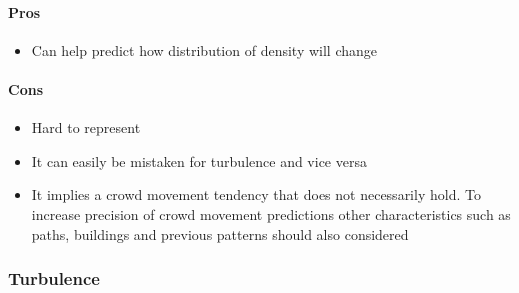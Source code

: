 
\paragraph{Pros}
\begin{itemize}
    \item Can help predict how distribution of density will change
\end{itemize}

\paragraph{Cons}
\begin{itemize}
    \item Hard to represent
    \item It can easily be mistaken for turbulence and vice versa
    \item It implies a crowd movement tendency that does not necessarily hold. To increase precision of crowd movement predictions other characteristics such as paths, buildings and previous patterns should also considered
\end{itemize}

\subsubsection{Turbulence}

